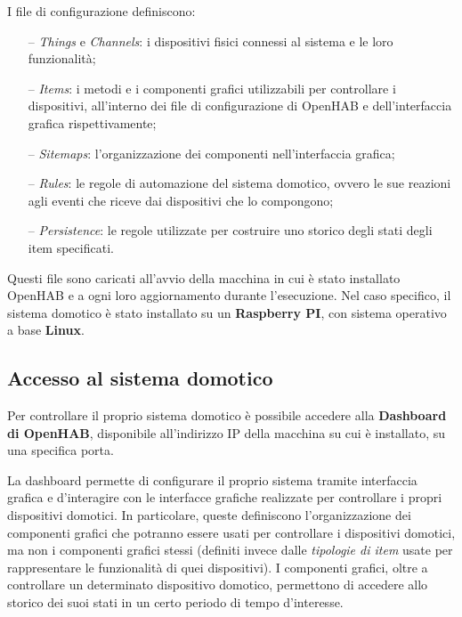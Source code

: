 I file di configurazione definiscono:

\begin{itemize}
  \item[--] \textit{Things} e \textit{Channels}: i dispositivi fisici connessi
        al sistema e le loro funzionalità;
  \item[--] \textit{Items}: i metodi e i componenti grafici utilizzabili per
        controllare i dispositivi, all’interno dei file di configurazione di
        OpenHAB e dell’interfaccia grafica rispettivamente;
  \item[--] \textit{Sitemaps}: l’organizzazione dei componenti nell’interfaccia
        grafica;
  \item[--] \textit{Rules}: le regole di automazione del sistema domotico,
        ovvero le sue reazioni agli eventi che riceve dai dispositivi che lo
        compongono;
  \item[--] \textit{Persistence}: le regole utilizzate per costruire uno
        storico degli stati degli item specificati.
\end{itemize}

Questi file sono caricati all’avvio della macchina in cui è stato installato
OpenHAB e a ogni loro aggiornamento durante l’esecuzione. Nel caso specifico,
il sistema domotico è stato installato su un \textbf{Raspberry PI}, con sistema
operativo a base \textbf{Linux}.

\subsection{Accesso al sistema domotico}
\label{subsec:Sezione5.1.2}

Per controllare il proprio sistema domotico è possibile accedere alla
\textbf{Dashboard di OpenHAB}, disponibile all’indirizzo IP della macchina su
cui è installato, su una specifica porta.

La dashboard permette di configurare il proprio sistema tramite interfaccia
grafica e d'interagire con le interfacce grafiche realizzate per controllare i
propri dispositivi domotici. In particolare, queste definiscono
l’organizzazione dei componenti grafici che potranno essere usati per
controllare i dispositivi domotici, ma non i componenti grafici stessi
(definiti invece dalle \textit{tipologie di item} usate per rappresentare le
funzionalità di quei dispositivi). I componenti grafici, oltre a controllare un
determinato dispositivo domotico, permettono di accedere allo storico dei suoi
stati in un certo periodo di tempo d’interesse.

